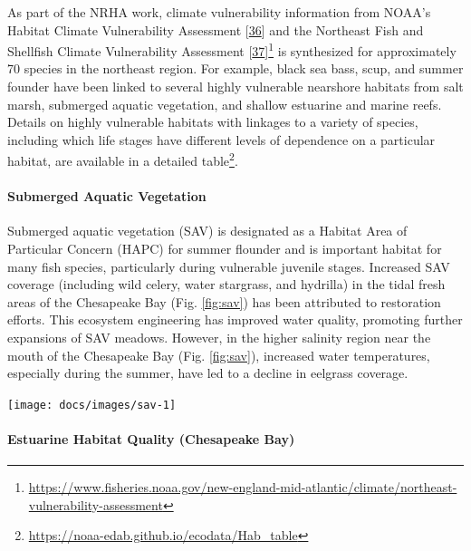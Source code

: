 \documentclass[
  10pt,
]{article}
\let\origfigure\figure
\let\endorigfigure\endfigure
\renewenvironment{figure}[1][2] {
    \expandafter\origfigure\expandafter[H]
} {
    \endorigfigure
}
\begin{document}
As part of the NRHA work, climate vulnerability information from NOAA's
Habitat Climate Vulnerability Assessment
{[}\protect\hyperlink{ref-farr_assessment_2021}{36}{]} and the Northeast
Fish and Shellfish Climate Vulnerability Assessment
{[}\protect\hyperlink{ref-hare_vulnerability_2016}{37}{]}\footnote{\url{https://www.fisheries.noaa.gov/new-england-mid-atlantic/climate/northeast-vulnerability-assessment}}
is synthesized for approximately 70 species in the northeast region. For
example, black sea bass, scup, and summer founder have been linked to
several highly vulnerable nearshore habitats from salt marsh, submerged
aquatic vegetation, and shallow estuarine and marine reefs. Details on
highly vulnerable habitats with linkages to a variety of species,
including which life stages have different levels of dependence on a
particular habitat, are available in a detailed table\footnote{\url{https://noaa-edab.github.io/ecodata/Hab_table}}.

\hypertarget{submerged-aquatic-vegetation}{%
\paragraph{Submerged Aquatic
Vegetation}\label{submerged-aquatic-vegetation}}

Submerged aquatic vegetation (SAV) is designated as a Habitat Area of
Particular Concern (HAPC) for summer flounder and is important habitat
for many fish species, particularly during vulnerable juvenile stages.
Increased SAV coverage (including wild celery, water stargrass, and
hydrilla) in the tidal fresh areas of the Chesapeake Bay (Fig.
\ref{fig:sav}) has been attributed to restoration efforts. This
ecosystem engineering has improved water quality, promoting further
expansions of SAV meadows. However, in the higher salinity region near
the mouth of the Chesapeake Bay (Fig. \ref{fig:sav}), increased water
temperatures, especially during the summer, have led to a decline in
eelgrass coverage.

\begin{figure}

{\centering \texttt{[image: docs/images/sav-1]} 

}

\caption{Submerged Aquatic Vegetation (SAV) coverage in tidal fresh and high salinity regions of the Chesapeake Bay.}\label{fig:sav}
\end{figure}

\hypertarget{estuarine-habitat-quality-chesapeake-bay}{%
\paragraph{Estuarine Habitat Quality (Chesapeake
Bay)}\label{estuarine-habitat-quality-chesapeake-bay}}
\end{document}

